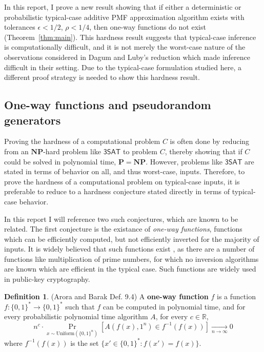 \documentclass{article}
\renewcommand{\P}{\mathbf{P}}
\newcommand{\NP}{\mathbf{NP}}
\theoremstyle{definition}
\newtheorem{defn}{Definition}
\theoremstyle{remark}
\begin{document}
In this report, I prove a new result showing that if either a deterministic or probabilistic typical-case additive PMF approximation algorithm exists with tolerances $\epsilon < 1/2$, $\rho < 1/4$, then one-way functions do not exist (Theorem~\ref{thm:main}).
This hardness result suggests that typical-case inference is computationally difficult, and it is not merely the worst-case nature of the observations considered in Dagum and Luby's reduction which made inference difficult in their setting.
Due to the typical-case formulation studied here, a different proof strategy is needed to show this hardness result.

\subsection{One-way functions and pseudorandom generators}
Proving the hardness of a computational problem $C$ is often done by reducing from an $\NP$-hard problem like $\mathsf{3SAT}$ to problem $C$, thereby showing that if $C$ could be solved in polynomial time, $\P = \NP$.
However, problems like $\mathsf{3SAT}$ are stated in terms of behavior on all, and thus worst-case, inputs.
Therefore, to prove the hardness of a computational problem on typical-case inputs, it is preferable to reduce to a hardness conjecture stated directly in terms of typical-case behavior.

In this report I will reference two such conjectures, which are known to be related.
The first conjecture is the existance of \textit{one-way functions}, functions which can be efficiently computed, but not efficiently inverted for the majority of inputs.
It is widely believed that such functions exist \cite{}, as there are a number of functions like multiplication of prime numbers, for which no inversion algorithms are known which are efficient in the typical case.
Such functions are widely used in public-key cryptography.

\begin{defn}{(Arora and Barak Def. 9.4)} \label{def:oneway}
A \textbf{one-way function} $f$ is a function $f : \{0, 1\}^* \to \{0, 1\}^*$ such that $f$ can be computed in polynomial time, and for every probabilistic polynomial time algorithm $A$, for every $c \in \mathbb{R}$,
\begin{equation} \label{eq:oneway}
n^c \cdot \Pr_{x \sim \text{Uniform}(\{0, 1\}^n)}[A(f(x), 1^n) \in f^{-1}(f(x))] \underset{n \to \infty}{\to} 0
\end{equation}
where $f^{-1}(f(x))$ is the set $\{x' \in \{0, 1\}^* : f(x') = f(x)\}$.
\end{defn}
\end{document}
